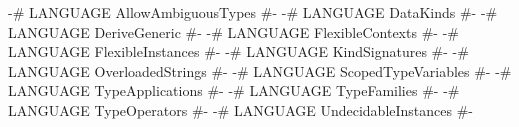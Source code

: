 \begin{code}
{-# LANGUAGE AllowAmbiguousTypes  #-}
{-# LANGUAGE DataKinds            #-}
{-# LANGUAGE DeriveGeneric        #-}
{-# LANGUAGE FlexibleContexts     #-}
{-# LANGUAGE FlexibleInstances    #-}
{-# LANGUAGE KindSignatures       #-}
{-# LANGUAGE OverloadedStrings    #-}
{-# LANGUAGE ScopedTypeVariables  #-}
{-# LANGUAGE TypeApplications     #-}
{-# LANGUAGE TypeFamilies         #-}
{-# LANGUAGE TypeOperators        #-}
{-# LANGUAGE UndecidableInstances #-}
\end{code}
